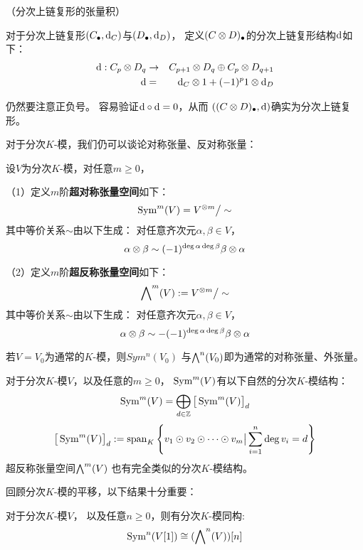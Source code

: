 \begin{definition}（分次上链复形的张量积）

对于分次上链复形$(C_{\bullet},\mathrm{d}_C)$与$(D_{\bullet},\mathrm{d}_D)$，
定义$(C\otimes D)_{\bullet}$的分次上链复形结构$\mathrm{d}$如下：
\begin{eqnarray*}
\mathrm{d}:C_p\otimes D_q &\to& C_{p+1}\otimes D_q\oplus C_p\otimes D_{q+1}\\
\mathrm{d} &=&\mathrm{d}_C\otimes 1+(-1)^p1\otimes \mathrm{d}_D
\end{eqnarray*}
\label{分次上链复形的张量积-def}
\end{definition}

仍然要注意正负号。
容易验证$\mathrm{d}\circ\mathrm{d}=0$，从而
$((C\otimes D)_{\bullet},\mathrm{d})$确实为分次上链复形。

对于分次$K$-模，我们仍可以谈论对称张量、反对称张量：

\begin{definition}设$V$为分次$K$-模，对任意$m\geq0$，

（1）定义$m$阶\textbf{超对称张量空间}如下：
$$\operatorname{Sym}^m(V)=V^{\otimes m}\big/\sim$$
其中等价关系$\sim$由以下生成：
对任意齐次元$\alpha,\beta\in V$，
$$\alpha\otimes\beta\sim(-1)^{\deg\alpha\deg\beta}\beta\otimes\alpha$$

（2）定义$m$阶\textbf{超反称张量空间}如下：
$$\bigwedge\nolimits^{m}(V):=V^{\otimes m}\big/\sim$$
其中等价关系$\sim$由以下生成：
对任意齐次元$\alpha,\beta\in V$，
$$\alpha\otimes\beta\sim-(-1)^{\deg\alpha\deg\beta}\beta\otimes\alpha$$
\end{definition}

若$V=V_0$为通常的$K$-模，则$Sym^n(V_0)$
与$\bigwedge\nolimits^{n}(V_0)$即为通常的对称张量、外张量。

对于分次$K$-模$V$，以及任意的$m\geq 0$，
$\operatorname{Sym}^m(V)$有以下自然的分次$K$-模结构：
$$\operatorname{Sym}^m(V)=\bigoplus_{d\in\mathbb{Z}}
\big[\operatorname{Sym}^m(V)\big]_d$$
$$\big[\operatorname{Sym}^m(V)\big]_d
:=\operatorname{span}_K\left\{
           v_1\odot v_2\odot\cdots\odot v_m
           \big|\sum\limits_{i=1}^n\deg v_i=d
         \right\}
$$
超反称张量空间$\bigwedge\nolimits^{m}(V)$
也有完全类似的分次$K$-模结构。

回顾分次$K$-模的平移，以下结果十分重要：


\begin{prop}对于分次$K$-模$V$，
以及任意$n\geq0$，则有分次$K$-模同构:
$$\operatorname{Sym}^n(V[1])\cong(\bigwedge\nolimits^{n}(V))[n]$$
\end{prop}

